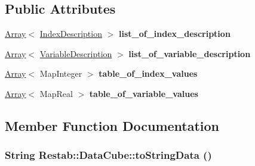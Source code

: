 \subsection*{Public Attributes}
\begin{DoxyCompactItemize}
\item 
\hypertarget{classRestab_1_1DataCube_a8d25283917638e817d20aed66780b31f}{
\hyperlink{classRestab_1_1Array}{Array}$<$ \hyperlink{classRestab_1_1IndexDescription}{IndexDescription} $>$ {\bfseries list\_\-of\_\-index\_\-description}}
\label{classRestab_1_1DataCube_a8d25283917638e817d20aed66780b31f}

\item 
\hypertarget{classRestab_1_1DataCube_a7ae0a0098d0b1987a8ae7002af1f5fb5}{
\hyperlink{classRestab_1_1Array}{Array}$<$ \hyperlink{classRestab_1_1VariableDescription}{VariableDescription} $>$ {\bfseries list\_\-of\_\-variable\_\-description}}
\label{classRestab_1_1DataCube_a7ae0a0098d0b1987a8ae7002af1f5fb5}

\item 
\hypertarget{classRestab_1_1DataCube_a874e37b1c8c16fcd2adc4118cdcaeaa7}{
\hyperlink{classRestab_1_1Array}{Array}$<$ MapInteger $>$ {\bfseries table\_\-of\_\-index\_\-values}}
\label{classRestab_1_1DataCube_a874e37b1c8c16fcd2adc4118cdcaeaa7}

\item 
\hypertarget{classRestab_1_1DataCube_a46fc810e07e9eb6de46d55fbab7c9095}{
\hyperlink{classRestab_1_1Array}{Array}$<$ MapReal $>$ {\bfseries table\_\-of\_\-variable\_\-values}}
\label{classRestab_1_1DataCube_a46fc810e07e9eb6de46d55fbab7c9095}

\end{DoxyCompactItemize}


\subsection{Member Function Documentation}
\hypertarget{classRestab_1_1DataCube_ab60df8cf202f561a6b7c18582c4921b5}{
\subsubsection[{toStringData}]{\setlength{\rightskip}{0pt plus 5cm}String Restab::DataCube::toStringData ()}}
\label{classRestab_1_1DataCube_ab60df8cf202f561a6b7c18582c4921b5}


